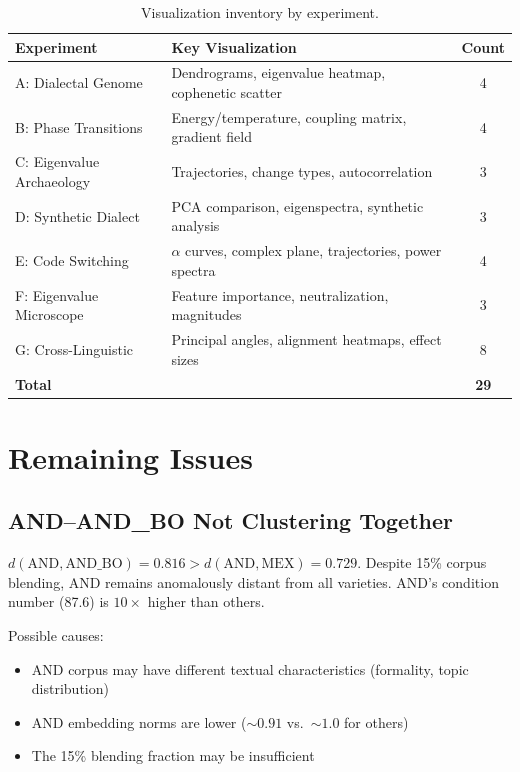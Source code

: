 \documentclass[11pt,a4paper]{article}
\begin{document}
\begin{table}[H]
\centering\small
\begin{tabular}{@{}llc@{}}
\toprule
\textbf{Experiment} & \textbf{Key Visualization} & \textbf{Count} \\
\midrule
A: Dialectal Genome & Dendrograms, eigenvalue heatmap, cophenetic scatter & 4 \\
B: Phase Transitions & Energy/temperature, coupling matrix, gradient field & 4 \\
C: Eigenvalue Archaeology & Trajectories, change types, autocorrelation & 3 \\
D: Synthetic Dialect & PCA comparison, eigenspectra, synthetic analysis & 3 \\
E: Code Switching & $\alpha$ curves, complex plane, trajectories, power spectra & 4 \\
F: Eigenvalue Microscope & Feature importance, neutralization, magnitudes & 3 \\
G: Cross-Linguistic & Principal angles, alignment heatmaps, effect sizes & 8 \\
\midrule
\textbf{Total} & & \textbf{29} \\
\bottomrule
\end{tabular}
\caption{Visualization inventory by experiment.}
\end{table}

\section{Remaining Issues}

\subsection{AND--AND\_BO Not Clustering Together}

$d(\text{AND}, \text{AND\_BO}) = 0.816 > d(\text{AND}, \text{MEX}) = 0.729$. Despite 15\% corpus blending, AND remains anomalously distant from all varieties. AND's condition number (87.6) is $10\times$ higher than others.

Possible causes:
\begin{itemize}[nosep]
\item AND corpus may have different textual characteristics (formality, topic distribution)
\item AND embedding norms are lower (${\sim}0.91$ vs.\ ${\sim}1.0$ for others)
\item The 15\% blending fraction may be insufficient
\end{itemize}
\end{document}
